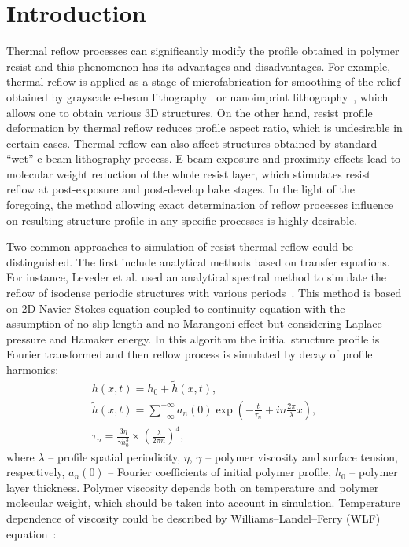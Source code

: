 \section{Introduction}

Thermal reflow processes can significantly modify the profile obtained in polymer resist and this phenomenon has its advantages and disadvantages.
For example, thermal reflow is applied as a stage of microfabrication for smoothing of the relief obtained by grayscale e-beam lithography~\cite{Kirchner_GL_review} or nanoimprint lithography~\cite{NIL_reflow}, which allows one to obtain various 3D structures.
On the other hand, resist profile deformation by thermal reflow reduces profile aspect ratio, which is undesirable in certain cases. Thermal reflow can also affect structures obtained by standard ``wet'' e-beam lithography process.
E-beam exposure and proximity effects lead to molecular weight reduction of the whole resist layer, which stimulates resist reflow at post-exposure and post-develop bake stages.
In the light of the foregoing, the method allowing exact determination of reflow processes influence on resulting structure profile in any specific processes is highly desirable.

Two common approaches to simulation of resist thermal reflow could be distinguished. The first include analytical methods based on transfer equations. For instance, Leveder et al. used an analytical spectral method to simulate the reflow of isodense periodic structures with various periods~\cite{Leveder_2008, Leveder_2010, Leveder_2011}. This method is based on 2D Navier-Stokes equation coupled to continuity equation with the assumption of no slip length and no Marangoni effect but considering Laplace pressure and Hamaker energy. In this algorithm the initial structure profile is Fourier transformed and then reflow process is simulated by decay of profile harmonics:
\begin{eqnarray} \label{eq:Fourier}
	h(x, t) = h_0 + \tilde{h}(x, t),\\
	\tilde{h}(x, t) = \sum_{-\infty}^{+\infty} a_n(0) \exp \left(-\frac{t}{\tau_n}+i n \frac{2 \pi}{\lambda} x \right),\\
	\tau_n = \frac{3 \eta}{\gamma h_0^3} \times \left( \frac{\lambda}{2 \pi n} \right)^4,
\end{eqnarray}
where $\lambda$ -- profile spatial periodicity, $\eta$, $\gamma$ -- polymer viscosity and surface tension, respectively, $a_n(0)$ -- Fourier coefficients of initial polymer profile, $h_0$ -- polymer layer thickness. Polymer viscosity depends both on temperature and polymer molecular weight, which should be taken into account in simulation. Temperature dependence of viscosity could be described by Williams–Landel–Ferry (WLF) equation~\cite{bird1987dynamics_WLF}:

